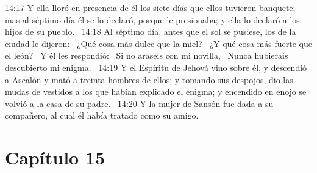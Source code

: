 14:17 Y ella lloró en presencia de él los siete días que ellos tuvieron banquete; mas al séptimo día él se lo declaró, porque le presionaba; y ella lo declaró a los hijos de su pueblo.  
14:18 Al séptimo día, antes que el sol se pusiese, los de la ciudad le dijeron:  
¿Qué cosa más dulce que la miel?  
¿Y qué cosa más fuerte que el león?  
Y él les respondió:  
Si no araseis con mi novilla,  
Nunca hubierais descubierto mi enigma.  
14:19 Y el Espíritu de Jehová vino sobre él, y descendió a Ascalón y mató a treinta hombres de ellos; y tomando sus despojos, dio las mudas de vestidos a los que habían explicado el enigma; y encendido en enojo se volvió a la casa de su padre.  
14:20 Y la mujer de Sansón fue dada a su compañero, al cual él había tratado como su amigo.  
\section*{Capítulo 15 }

